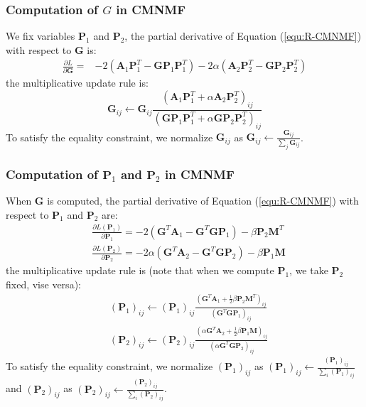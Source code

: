 \documentclass{bmcart}
\begin{document}
\subsubsection*{\textbf{Computation of $G$ in CMNMF}}
We fix variables $\bm{P}_1$ and $\bm{P}_2$, the partial derivative of Equation (\ref{equ:R-CMNMF}) with respect to $\bm{G}$ is:
\begin{equation}\label{equ:G_gradient}\nonumber
\begin{split}
\frac{\partial{L}}{\partial{\bm{G}}}=
&-2(\bm{A}_1{\bm{P}_1^T} - \bm{G}{\bm{P}_1}{\bm{P}_1^T})-2\alpha(\bm{A}_2{\bm{P}_2^T} - \bm{G}{\bm{P}_2}{\bm{P}_2^T})
\end{split}
\end{equation}
the multiplicative update rule is:
\begin{equation}\label{equ:updating_G}\nonumber
\bm{G}_{ij}\leftarrow \bm{G}_{ij}
\frac{(\bm{A}_1\bm{P}_1^T+\alpha \bm{A}_2\bm{P}_2^T)_{ij}}
{(\bm{GP}_1\bm{P}_1^T+\alpha \bm{GP}_2\bm{P}_2^T
)_{ij}}
\end{equation}
To satisfy the equality constraint, we normalize $\bm{G}_{ij}$ as $\bm{G}_{ij}\leftarrow\frac{\bm{G}_{ij}}{\sum_{j}\bm{G}_{ij}}$.

\subsubsection*{\textbf{Computation of $\bm{P}_1$ and $\bm{P}_2$ in CMNMF}}
When $\bm{G}$ is computed, the partial derivative of Equation (\ref{equ:R-CMNMF}) with respect to $\bm{P}_1$ and $\bm{P}_2$ are:
\begin{equation}\label{equ:P1_gradient}\nonumber
\begin{split}
&\frac{\partial{L(\bm{P}_1)}}{\partial{\bm{P}_1}}=
-2(\bm{G}^T\bm{A}_1-{\bm{G}^T\bm{GP}_1})-\beta \bm{P}_2\bm{M}^T %
\\
&\frac{\partial{L(\bm{P}_2)}}{\partial{\bm{P}_2}}=
-2\alpha(\bm{G}^T\bm{A}_2-{\bm{G}^T\bm{GP}_2})-\beta \bm{P}_1\bm{M} %
\end{split}
\end{equation}
the multiplicative update rule is (note that when we compute $\bm{P}_1$, we take $\bm{P}_2$ fixed, vise versa):
\begin{equation}\label{updating_P}\nonumber
\begin{split}
&(\bm{P}_1)_{ij}\leftarrow (\bm{P}_1)_{ij}
\frac{(\bm{G}^T\bm{A}_1+\frac{1}{2}\beta \bm{P}_2\bm{M}^T)_{ij}}
{(\bm{G}^T\bm{GP}_1
)_{ij}}\\
&(\bm{P}_2)_{ij}\leftarrow (\bm{P}_2)_{ij}
\frac{(\alpha \bm{G}^T\bm{A}_2+\frac{1}{2}\beta \bm{P}_1\bm{M})_{ij}}
{(\alpha \bm{G}^T\bm{GP}_2
)_{ij}}
\end{split}
\end{equation}
To satisfy the equality constraint, we normalize $(\bm{P}_1)_{ij}$ as $(\bm{P}_1)_{ij}\leftarrow \frac{(\bm{P}_1)_{ij}}{\sum_{i}(\bm{P}_1)_{ij}}
$ and $(\bm{P}_2)_{ij}$ as $(\bm{P}_2)_{ij}\leftarrow \frac{(\bm{P}_2)_{ij}}{\sum_{i}(\bm{P}_2)_{ij}}$.
\end{document}
